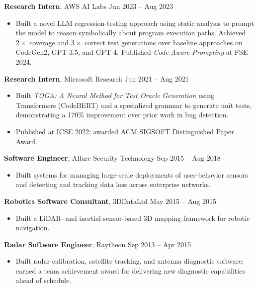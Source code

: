 \documentclass{article} %
\newcommand{\rjob}[2]{
  \hspace*{-0.3cm}
{\fontsize{10pt}{12pt}\selectfont #1} \hfill #2
\hspace*{-1.2cm}
}
\newenvironment{ritemize}{
\hspace*{-0.8cm}
\begin{minipage}{1.05\linewidth}
\fontsize{10pt}{11pt}\selectfont
\vspace{0.1cm}
\begin{itemize}[itemsep=0pt,parsep=0pt,topsep=1pt,partopsep=0pt]
}{
\end{itemize}
\end{minipage}
\vspace{-0.1cm}
}
\newcommand{\ritem}{
\item[-]
}
\begin{document}
\rjob{\textbf{Research Intern}, AWS AI Labs}{Jun 2023 -- Aug 2023}\\
\begin{ritemize}
  \ritem Built a novel LLM regression-testing approach using static analysis to prompt the model to reason symbolically about program execution paths. Achieved $2\times$ coverage and $3\times$ correct test generations over baseline approaches on CodeGen2, GPT-3.5, and GPT-4. Published \textit{Code-Aware Prompting} at FSE 2024.
\end{ritemize}


\rjob{\textbf{Research Intern}, Microsoft Research}{Jun 2021 -- Aug 2021}\\
\begin{ritemize}
    \ritem Built \textit{TOGA: A Neural Method for Test Oracle Generation} using Transformers (CodeBERT) and a specialized grammar to generate unit tests, demonstrating a 170\% improvement over prior work in bug detection.
    \ritem Published at ICSE 2022; awarded ACM SIGSOFT Distinguished Paper Award.
\end{ritemize}

\rjob{\textbf{Software Engineer}, Allure Security Technology}{Sep 2015 -- Aug 2018}\\
\begin{ritemize}
\ritem Built systems for managing large-scale deployments of user-behavior sensors and detecting and tracking data loss across enterprise networks.
\end{ritemize}

\rjob{\textbf{Robotics Software Consultant}, 3DDataLtd}{May 2015 -- Aug 2015}\\
\begin{ritemize}
\ritem Built a LiDAR- and inertial-sensor-based 3D mapping framework for robotic navigation.
\end{ritemize}

\rjob{\textbf{Radar Software Engineer}, Raytheon}{Sep 2013 -- Apr 2015}\\
\begin{ritemize}
\ritem Built radar calibration, satellite tracking, and antenna diagnostic software; earned a team achievement award for delivering new diagnostic capabilities ahead of schedule.
\end{ritemize}






\end{document}
